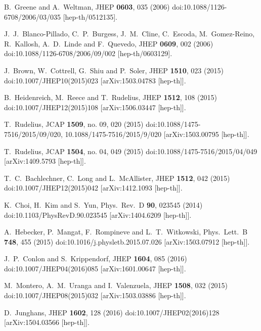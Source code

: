 \documentclass[12pt]{article}
\begin{document}
\begin{thebibliography}{99}
  B.~Greene and A.~Weltman,
  JHEP {\bf 0603}, 035 (2006)
  doi:10.1088/1126-6708/2006/03/035
  [hep-th/0512135].

  J.~J.~Blanco-Pillado, C.~P.~Burgess, J.~M.~Cline, C.~Escoda, M.~Gomez-Reino, R.~Kallosh, A.~D.~Linde and F.~Quevedo,
  JHEP {\bf 0609}, 002 (2006)
  doi:10.1088/1126-6708/2006/09/002
  [hep-th/0603129].

  J.~Brown, W.~Cottrell, G.~Shiu and P.~Soler,
  JHEP {\bf 1510}, 023 (2015)
  doi:10.1007/JHEP10(2015)023
  [arXiv:1503.04783 [hep-th]].

  B.~Heidenreich, M.~Reece and T.~Rudelius,
  JHEP {\bf 1512}, 108 (2015)
  doi:10.1007/JHEP12(2015)108
  [arXiv:1506.03447 [hep-th]].

  T.~Rudelius,
  JCAP {\bf 1509}, no. 09, 020 (2015)
  doi:10.1088/1475-7516/2015/09/020, 10.1088/1475-7516/2015/9/020
  [arXiv:1503.00795 [hep-th]].

  T.~Rudelius,
  JCAP {\bf 1504}, no. 04, 049 (2015)
  doi:10.1088/1475-7516/2015/04/049
  [arXiv:1409.5793 [hep-th]].

  T.~C.~Bachlechner, C.~Long and L.~McAllister,
  JHEP {\bf 1512}, 042 (2015)
  doi:10.1007/JHEP12(2015)042
  [arXiv:1412.1093 [hep-th]].

  K.~Choi, H.~Kim and S.~Yun,
  Phys.\ Rev.\ D {\bf 90}, 023545 (2014)
  doi:10.1103/PhysRevD.90.023545
  [arXiv:1404.6209 [hep-th]].

  A.~Hebecker, P.~Mangat, F.~Rompineve and L.~T.~Witkowski,
  Phys.\ Lett.\ B {\bf 748}, 455 (2015)
  doi:10.1016/j.physletb.2015.07.026
  [arXiv:1503.07912 [hep-th]].

  J.~P.~Conlon and S.~Krippendorf,
  JHEP {\bf 1604}, 085 (2016)
  doi:10.1007/JHEP04(2016)085
  [arXiv:1601.00647 [hep-th]].

  M.~Montero, A.~M.~Uranga and I.~Valenzuela,
  JHEP {\bf 1508}, 032 (2015)
  doi:10.1007/JHEP08(2015)032
  [arXiv:1503.03886 [hep-th]].

  D.~Junghans,
  JHEP {\bf 1602}, 128 (2016)
  doi:10.1007/JHEP02(2016)128
  [arXiv:1504.03566 [hep-th]].

\end{thebibliography}
\end{document}

